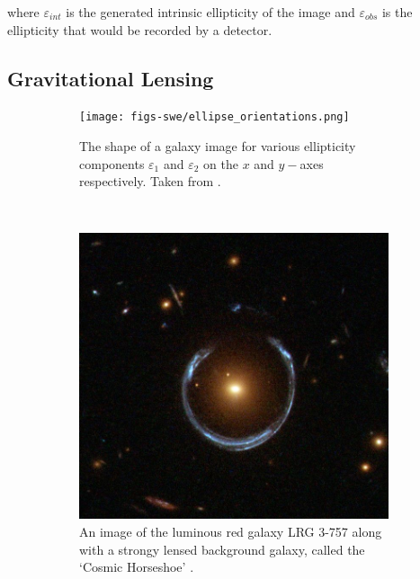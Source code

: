 \documentclass[%
 reprint,
 amsmath,amssymb,
 aps,nofootinbib
]{revtex4-1}
\begin{document}
\noindent where $\varepsilon_{int}$ is the generated intrinsic ellipticity of the image and $\varepsilon_{obs}$ is the ellipticity that would be recorded by a detector.

\subsection*{Gravitational Lensing}

\begin{figure}
    \centering
    \begin{subfigure}[H]{0.415\textwidth}
        \texttt{[image: figs-swe/ellipse\_orientations.png]}
        \captionsetup{justification=raggedright,singlelinecheck=false}
        \caption{The shape of a galaxy image for various ellipticity components $\varepsilon_1$ and $\varepsilon_2$ on the $x$ and $y-$axes respectively. Taken from \cite{schneider}.}
        \label{ellipses}
    \end{subfigure}
    ~
    \begin{subfigure}[H]{0.425\textwidth}
        \includegraphics[width=\textwidth]{figs-swe/einstein_ring.png}
        \captionsetup{justification=raggedright,singlelinecheck=false}
        \caption{An image of the luminous red galaxy LRG 3-757 along with a strongy lensed background galaxy, called the `Cosmic Horseshoe' \cite{einstein_ring}.}
        \label{einstein_ring}
    \end{subfigure}
    \caption{}
\end{figure}
\end{document}
